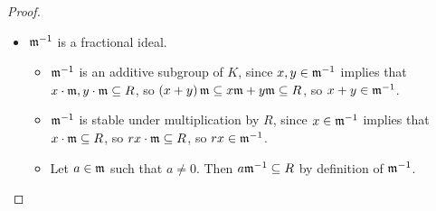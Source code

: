 \begin{proof}
\hfill
\begin{itemize}
\item $ \mathfrak{m}^{-1} $ is a fractional ideal.
\begin{itemize}
\item $ \mathfrak{m}^{-1} $ is an additive subgroup of $ K $, since $ x, y \in \mathfrak{m}^{-1} $ implies that $ x \cdot \mathfrak{m}, y \cdot \mathfrak{m} \subseteq R $, so $ \br{x + y}\mm \subseteq x\mm + y\mm \subseteq R $, so $ x + y \in \mathfrak{m}^{-1} $.
\item $ \mathfrak{m}^{-1} $ is stable under multiplication by $ R $, since $ x \in \mathfrak{m}^{-1} $ implies that $ x \cdot \mathfrak{m} \subseteq R $, so $ rx \cdot \mathfrak{m} \subseteq R $, so $ rx \in \mathfrak{m}^{-1} $.
\item Let $ a \in \mathfrak{m} $ such that $ a \ne 0 $. Then $ a\mathfrak{m}^{-1} \subseteq R $ by definition of $ \mathfrak{m}^{-1} $.
\end{itemize}

\pagebreak


\end{itemize}
\end{proof}
